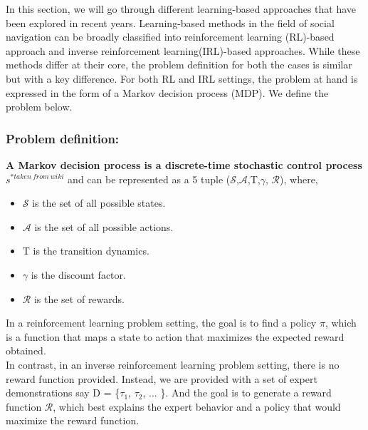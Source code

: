In this section, we will go through different learning-based approaches that have been explored in recent years. Learning-based methods in the field of social navigation can be broadly classified into reinforcement learning (RL)-based approach and inverse reinforcement learning(IRL)-based approaches. While these methods differ at their core, the problem definition for both the cases is similar but with a key difference. For both RL and IRL settings, the problem at hand is expressed in the form of a Markov decision process (MDP). We define the problem below.
\subsubsection*{Problem definition:}
\textbf{A Markov decision process is a discrete-time stochastic control process $s^{*taken\ from\ wiki}$} and can be represented as a 5 tuple
($\mathcal{S}$,$\mathcal{A}$,T,$\gamma$, $\mathcal{R}$), where,
\begin{itemize}
    \item $\mathcal{S}$ is the set of all possible states.
    \item $\mathcal{A}$ is the set of all possible actions.
    \item T is the transition dynamics.
    \item $\gamma$ is the discount factor.
    \item $\mathcal{R}$ is the set of rewards.
\end{itemize}  
In a reinforcement learning problem setting, the goal is to find a policy $\pi$, which is a function that maps a state to action that maximizes the expected reward obtained.\\
In contrast, in an inverse reinforcement learning problem setting, there is no reward function provided. Instead, we are provided with a set of expert demonstrations say D = \{$\tau_1$, $\tau_2$, ... \}. And the goal is to generate a reward function $\mathcal{R}$, which best explains the expert behavior and a policy that would maximize the reward function.


